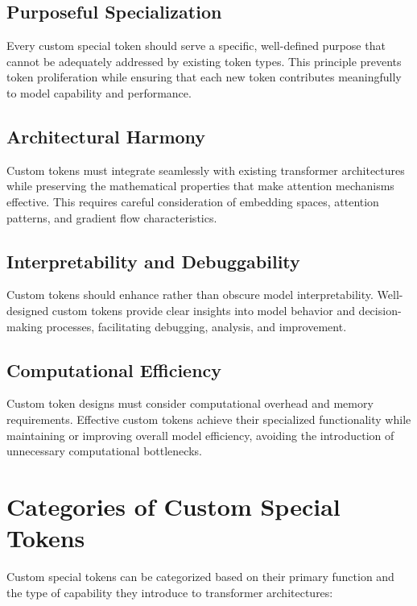 \subsection{Purposeful Specialization}

Every custom special token should serve a specific, well-defined purpose that cannot be adequately addressed by existing token types. This principle prevents token proliferation while ensuring that each new token contributes meaningfully to model capability and performance.

\subsection{Architectural Harmony}

Custom tokens must integrate seamlessly with existing transformer architectures while preserving the mathematical properties that make attention mechanisms effective. This requires careful consideration of embedding spaces, attention patterns, and gradient flow characteristics.

\subsection{Interpretability and Debuggability}

Custom tokens should enhance rather than obscure model interpretability. Well-designed custom tokens provide clear insights into model behavior and decision-making processes, facilitating debugging, analysis, and improvement.

\subsection{Computational Efficiency}

Custom token designs must consider computational overhead and memory requirements. Effective custom tokens achieve their specialized functionality while maintaining or improving overall model efficiency, avoiding the introduction of unnecessary computational bottlenecks.

\section{Categories of Custom Special Tokens}

Custom special tokens can be categorized based on their primary function and the type of capability they introduce to transformer architectures:

